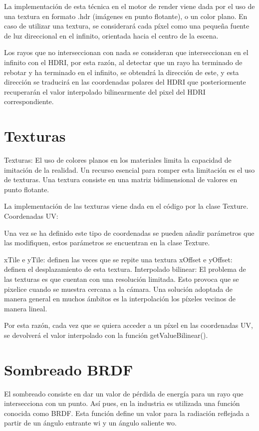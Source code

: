 	La implementación de esta técnica en el motor de render viene dada por el uso de una textura en formato .hdr (imágenes en punto flotante), o un color plano. En caso de utilizar una textura, se considerará cada píxel como una pequeña fuente de luz direccional en el infinito, orientada hacia el centro de la escena. 

	Los rayos que no interseccionan con nada se consideran que interseccionan en el infinito con el HDRI, por esta razón, al detectar que un rayo ha terminado de rebotar y ha terminado en el infinito, se obtendrá la dirección de este, y esta dirección se traducirá en las coordenadas polares del HDRI que posteriormente recuperarán el valor interpolado bilinearmente del pixel del HDRI correspondiente.


	\section{Texturas}
	
	Texturas:
	El uso de colores planos en los materiales limita la capacidad de imitación de la realidad. Un recurso esencial para romper esta limitación es el uso de texturas. Una textura consiste en una matriz bidimensional de valores en punto flotante.

	La implementación de las texturas viene dada en el código por la clase Texture.
	Coordenadas UV:

	Una vez se ha definido este tipo de coordenadas se pueden añadir parámetros que las modifiquen, estos parámetros se encuentran en la clase Texture.

	xTile e yTile: definen las veces que se repite una textura
	xOffset e yOffset: definen el desplazamiento de esta textura.
	Interpolado bilinear:
	El problema de las texturas es que cuentan con una resolución limitada. Esto provoca que se pixelice cuando se muestra cercana a la cámara. Una solución adoptada de manera general en muchos ámbitos es la interpolación los píxeles vecinos de manera lineal. 




	Por esta razón, cada vez que se quiera acceder a un píxel en las coordenadas UV, se devolverá el valor interpolado con la función getValueBilinear().

	
	\section{Sombreado BRDF}
	
		
	El sombreado consiste en dar un valor de pérdida de energía para un rayo que intersecciona con un punto. Así pues, en la industria es utilizada una función conocida como BRDF. Esta función define un valor para la radiación reflejada a partir de un ángulo entrante wi y un ángulo saliente wo.

